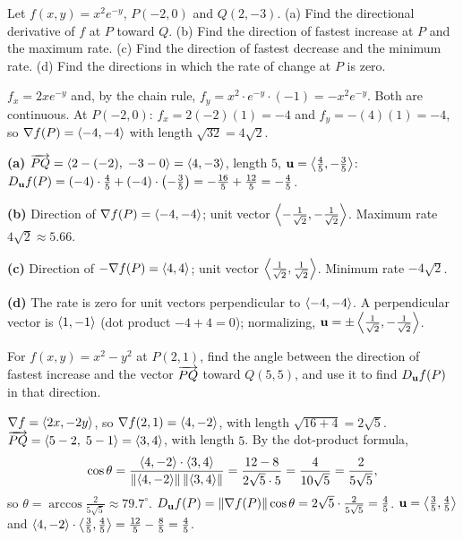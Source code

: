 \begin{problem}\label{prob:p24}
Let $f(x,y)=x^2e^{-y}$, $P(-2,0)$ and $Q(2,-3)$.
(a) Find the directional derivative of $f$ at $P$ toward $Q$.
(b) Find the direction of fastest increase at $P$ and the maximum rate.
(c) Find the direction of fastest decrease and the minimum rate.
(d) Find the directions in which the rate of change at $P$ is zero.
\end{problem}
\begin{solution}
 $f_x=2xe^{-y}$ and, by the chain rule, $f_y=x^2\cdot e^{-y}\cdot(-1)=-x^2e^{-y}$.
Both are continuous. At $P(-2,0)$: $f_x=2(-2)(1)=-4$ and $f_y=-(4)(1)=-4$, so
$\nabla f(P)=\left\langle -4,-4 \right\rangle$ with length $\sqrt{32}=4\sqrt2$.

\textbf{(a)} $\overrightarrow{PQ}=\left\langle 2-(-2),\;-3-0 \right\rangle=\left\langle 4,-3 \right\rangle$, length $5$, $\mathbf{u}=\left\langle \frac45,-\frac35 \right\rangle$:
$D_{\mathbf{u}} f(P)=(-4)\cdot\frac45+(-4)\cdot\left(-\frac35\right)=-\frac{16}{5}+\frac{12}{5}=-\frac45$.

\textbf{(b)} Direction of $\nabla f(P)=\left\langle -4,-4 \right\rangle$; unit vector $\left\langle -\frac{1}{\sqrt2},-\frac{1}{\sqrt2} \right\rangle$.
Maximum rate $4\sqrt2\approx5.66$.

\textbf{(c)} Direction of $-\nabla f(P)=\left\langle 4,4 \right\rangle$; unit vector $\left\langle \frac{1}{\sqrt2},\frac{1}{\sqrt2} \right\rangle$.
Minimum rate $-4\sqrt2$.

\textbf{(d)} The rate is zero for unit vectors perpendicular to $\left\langle -4,-4 \right\rangle$. A perpendicular
vector is $\left\langle 1,-1 \right\rangle$ (dot product $-4+4=0$); normalizing, $\mathbf{u}=\pm\left\langle \frac{1}{\sqrt2},-\frac{1}{\sqrt2} \right\rangle$.
\end{solution}

\begin{problem}[$*$]\label{prob:angle-between}
For $f(x,y)=x^2-y^2$ at $P(2,1)$, find the angle between the direction of
fastest increase and the vector $\overrightarrow{PQ}$ toward $Q(5,5)$, and use it to find
$D_{\mathbf{u}} f(P)$ in that direction.
\end{problem}
\begin{solution}
 $\nabla f=\left\langle 2x,-2y \right\rangle$, so $\nabla f(2,1)=\left\langle 4,-2 \right\rangle$, with length $\sqrt{16+4}=2\sqrt5$.
 $\overrightarrow{PQ}=\left\langle 5-2,\;5-1 \right\rangle=\left\langle 3,4 \right\rangle$, with length $5$.
 By the dot-product formula,
\[
  \cos\theta=\frac{\left\langle 4,-2 \right\rangle\cdot\left\langle 3,4 \right\rangle}{\lVert\left\langle 4,-2 \right\rangle\rVert\,\lVert\left\langle 3,4 \right\rangle\rVert}=\frac{12-8}{2\sqrt5\cdot5}=\frac{4}{10\sqrt5}=\frac{2}{5\sqrt5},
\]
so $\theta=\arccos\frac{2}{5\sqrt5}\approx79.7^\circ$.
 $D_{\mathbf{u}} f(P)=\lVert\nabla f(P)\rVert\cos\theta=2\sqrt5\cdot\frac{2}{5\sqrt5}=\frac45$.
 $\mathbf{u}=\left\langle \frac35,\frac45 \right\rangle$ and $\left\langle 4,-2 \right\rangle\cdot\left\langle \frac35,\frac45 \right\rangle=\frac{12}{5}-\frac85=\frac45$.\checkok
{}
\end{solution}
